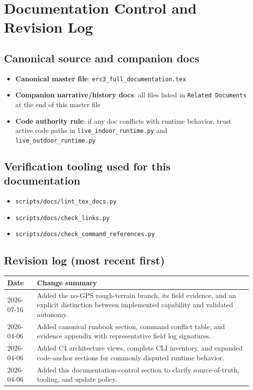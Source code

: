 \documentclass[11pt]{article}
\begin{document}
\section{Documentation Control and Revision Log}

\subsection*{Canonical source and companion docs}

\begin{itemize}[nosep]
  \item \textbf{Canonical master file}: \texttt{erc3\_full\_documentation.tex}
  \item \textbf{Companion narrative/history docs}: all files listed in
  \texttt{Related Documents} at the end of this master file
  \item \textbf{Code authority rule}: if any doc conflicts with runtime behavior,
  trust active code paths in \texttt{live\_indoor\_runtime.py} and
  \texttt{live\_outdoor\_runtime.py}
\end{itemize}

\subsection*{Verification tooling used for this documentation}

\begin{itemize}[nosep]
  \item \texttt{scripts/docs/lint\_tex\_docs.py}
  \item \texttt{scripts/docs/check\_links.py}
  \item \texttt{scripts/docs/check\_command\_references.py}
\end{itemize}

\subsection*{Revision log (most recent first)}

\begin{longtable}{p{}p{}}
\toprule
\textbf{Date} & \textbf{Change summary} \\
\midrule
2026-07-16 & Added the no-GPS rough-terrain branch, its field evidence, and an explicit distinction between implemented capability and validated autonomy. \\
2026-04-06 & Added canonical runbook section, command conflict table, and evidence appendix with representative field log signatures. \\
2026-04-06 & Added C4 architecture views, complete CLI inventory, and expanded code-anchor sections for commonly disputed runtime behavior. \\
2026-04-06 & Added this documentation-control section to clarify source-of-truth, tooling, and update policy. \\
\bottomrule
\end{longtable}
\end{document}
